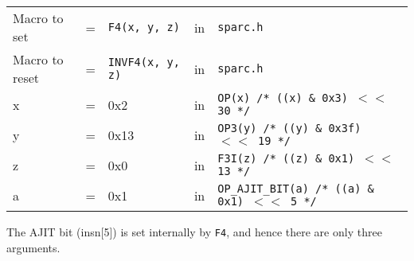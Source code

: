 \begin{enumerate}
  \begin{tabular}[h]{lclcl}
    Macro to set  &=& \texttt{F4(x, y, z)} &in& \texttt{sparc.h}     \\
    Macro to reset  &=& \texttt{INVF4(x, y, z)} &in& \texttt{sparc.h}     \\
    x &=& 0x2      &in& \texttt{OP(x)  /* ((x) \& 0x3)  $<<$ 30 */} \\
    y &=& 0x13     &in& \texttt{OP3(y) /* ((y) \& 0x3f) $<<$ 19 */} \\
    z &=& 0x0      &in& \texttt{F3I(z) /* ((z) \& 0x1)  $<<$ 13 */} \\
    a &=& 0x1      &in& \texttt{OP\_AJIT\_BIT(a) /* ((a) \& 0x1)  $<<$ 5 */}
  \end{tabular}

  The AJIT bit  (insn[5]) is set internally by  \texttt{F4}, and hence
  there are only three arguments.


\end{enumerate}
